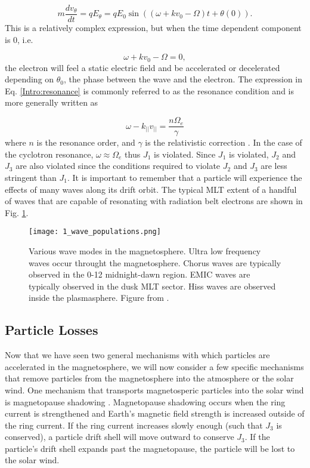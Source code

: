 \begin{equation}
m \frac{dv_\theta}{dt} = qE_\theta = qE_0 \sin{((\omega + kv_0 - \Omega)t + \theta(0))}.
\end{equation} This is a relatively complex expression, but when the time dependent component is 0, i.e. 

\begin{equation} \label{Intro:resonance}
\omega + kv_0 - \Omega = 0,
\end{equation} the electron will feel a static electric field and be accelerated or decelerated depending on $\theta_0$, the phase between the wave and the electron. The expression in Eq. \ref{Intro:resonance} is commonly referred to as the resonance condition and is more generally written as 

\begin{equation} \label{Intro:resonance_general}
\omega - k_{||} v_{||} = \frac{n \Omega_e}{\gamma}
\end{equation} where $n$ is the resonance order, and $\gamma$ is the relativistic correction \citep[e.g.][]{Millan2007}. In the case of the cyclotron resonance, $\omega \approx \Omega_e$ thus $J_1$ is violated. Since $J_1$ is violated, $J_2$ and $J_3$ are also violated since the conditions required to violate $J_2$ and $J_3$ are less stringent than $J_1$. It is important to remember that a particle will experience the effects of many waves along its drift orbit. The typical MLT extent of a handful of waves that are capable of resonating with radiation belt electrons are shown in Fig. \ref{Intro:waves}.

\begin{figure}
\texttt{[image: 1\_wave\_populations.png]}
\caption{Various wave modes in the magnetosphere. Ultra low frequency waves occur throught the magnetosphere. Chorus waves are typically observed in the 0-12 midnight-dawn region. EMIC waves are typically observed in the dusk MLT sector. Hiss waves are observed inside the plasmasphere. Figure from \citet{Millan2007}.}
\label{Intro:waves}
\end{figure}

\subsection{Particle Losses}\label{Intro:losses}
Now that we have seen two general mechanisms with which particles are accelerated in the magnetosphere, we will now consider a few specific mechanisms that remove particles from the magnetosphere into the atmosphere or the solar wind. One mechanism that transports magnetosperic particles into the solar wind is magnetopause shadowing \citep[e.g.][]{Ukhorskiy2006}. Magnetopause shadowing occurs when the ring current is strengthened and Earth's magnetic field strength is increased outside of the ring current. If the ring current increases slowly enough (such that $J_3$ is conserved), a particle drift shell will move outward to conserve $J_3$. If the particle's drift shell expands past the magnetopause, the particle will be lost to the solar wind.

